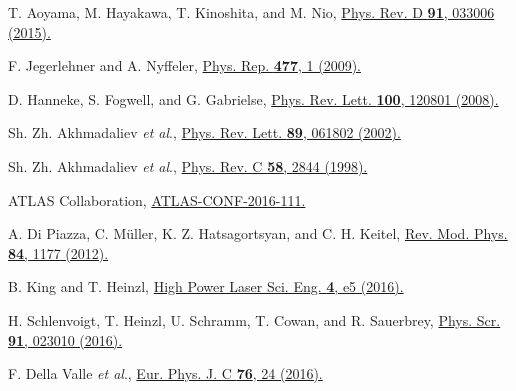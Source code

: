 \documentclass[10pt,a4paper]{article}%
\begin{document}
\begin{thebibliography}{999}
\small
{}
T. Aoyama, M. Hayakawa, T. Kinoshita, and M. Nio,
\href{https://doi.org/10.1103/PhysRevD.91.033006}
{Phys. Rev. D {\bf 91}, 033006 (2015).}

F. Jegerlehner and A. Nyffeler,
\href{http://doi.org/10.1016/j.physrep.2009.04.003}
{Phys. Rep. {\bf 477}, 1 (2009).}

D. Hanneke, S. Fogwell, and G. Gabrielse,
\href{http://doi.org/10.1103/PhysRevLett.100.120801}
{Phys. Rev. Lett. {\bf 100}, 120801 (2008).}

Sh. Zh. Akhmadaliev {\it et al}.,
\href{http://doi.org/10.1103/PhysRevLett.89.061802}
{Phys. Rev. Lett. {\bf 89}, 061802 (2002).}

Sh. Zh. Akhmadaliev {\it et al}.,
\href{https://doi.org/10.1103/PhysRevC.58.2844}
{Phys. Rev. C {\bf 58}, 2844 (1998).}

ATLAS Collaboration,
\href{http://cds.cern.ch/record/2220773}
{ATLAS-CONF-2016-111.}

A. Di Piazza, C. M\"uller, K. Z. Hatsagortsyan, and C. H. Keitel,
\href{https://doi.org/10.1103/RevModPhys.84.1177}
{Rev. Mod. Phys. {\bf 84}, 1177 (2012).}

B. King and T. Heinzl,
\href{https://doi.org/10.1017/hpl.2016.1}
{High Power Laser Sci. Eng. {\bf 4}, e5 (2016).}

H. Schlenvoigt, T. Heinzl, U. Schramm, T. Cowan, and R. Sauerbrey,
\href{http://doi.org/10.1088/0031-8949/91/2/023010}
{Phys. Scr. {\bf 91}, 023010 (2016).}

F. Della Valle {\it et al}.,
\href{https://doi.org/10.1140/epjc/s10052-015-3869-8}
{Eur. Phys. J. C {\bf 76}, 24 (2016).}


\end{thebibliography}
\end{document}
